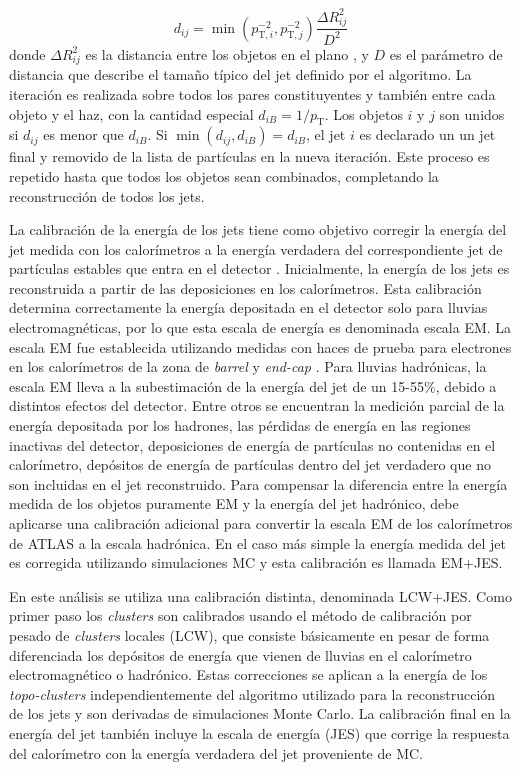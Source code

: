 \begin{equation}
  d_{ij} = \min(p_{\mathrm{T},i}^{-2}, p_{\mathrm{T},j}^{-2}) \frac{\Delta R_{ij}^2}{D^2}
\end{equation}
%
donde $\Delta R_{ij}^2$ es la distancia entre los objetos en el plano {\etaphi},
y $D$ es el parámetro de distancia que describe el tamaño típico del jet
definido por el algoritmo. La iteración es realizada sobre todos los pares
constituyentes y también entre cada objeto y el haz, con la cantidad especial
$d_{iB} = 1/p_{\mathrm{T}}$. Los objetos $i$ y $j$ son unidos si $d_{ij}$ es
menor que $d_{iB}$.
Si $\min(d_{ij}, d_{iB}) = d_{iB}$, el jet $i$ es declarado un un jet final y
removido de la lista de partículas en la nueva iteración. Este proceso es
repetido hasta que todos los objetos sean combinados, completando la
reconstrucción de todos los jets.

La calibración de la energía de los jets tiene como objetivo corregir la energía
del jet medida con los calorímetros a la energía verdadera del correspondiente
jet de partículas estables que entra en el detector \cite{Aad:2011he}. Inicialmente, la energía de
los jets es reconstruida a partir de las deposiciones en los calorímetros. Esta
calibración determina correctamente la energía depositada en el detector solo
para lluvias electromagnéticas, por lo que esta escala de energía es denominada escala
EM.
La escala EM fue establecida utilizando medidas con haces de prueba para
electrones en los calorímetros de la zona de \emph{barrel}
\cite{Abat:1900zz,Aharrouche:2010zz,Adragna:2009zz} y \emph{end-cap}
\cite{Pinfold:2008zzb,2004NIMPA.531..481C}.
Para lluvias hadrónicas, la escala EM lleva a la subestimación de la energía del
jet de un 15-55\%, debido a distintos efectos del detector. Entre otros se
encuentran la medición parcial de la energía depositada por los hadrones, las
pérdidas de energía en las regiones inactivas del detector, deposiciones de
energía de partículas no contenidas en el calorímetro, depósitos de energía de
partículas dentro del jet verdadero que no son incluidas en el jet reconstruido.
Para compensar la diferencia entre la energía medida de los objetos puramente EM
y la energía del jet hadrónico, debe aplicarse una calibración adicional para
convertir la escala EM de los calorímetros de ATLAS a la escala hadrónica.
En el caso más simple la energía medida del jet es corregida utilizando
simulaciones MC y esta calibración es llamada EM+JES.

En este análisis se utiliza una calibración distinta, denominada LCW+JES. Como
primer paso los \emph{clusters} son calibrados usando el método de calibración por
pesado de \emph{clusters} locales (LCW), que consiste básicamente en pesar de forma
diferenciada los depósitos de energía que vienen de lluvias en el calorímetro
electromagnético o hadrónico. Estas correcciones se aplican a la energía de los
\emph{topo-clusters} independientemente del algoritmo utilizado para la reconstrucción
de los jets y son derivadas de simulaciones Monte Carlo. La calibración final en
la energía del jet también incluye la escala de energía (JES) que corrige la
respuesta del calorímetro con la energía verdadera del jet proveniente de MC.

